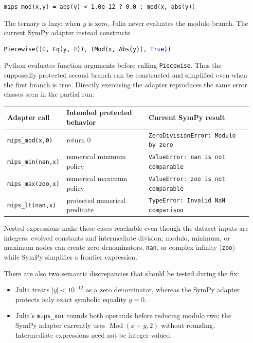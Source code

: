 \documentclass[10pt]{article}
\begin{document}
\begin{lstlisting}
mips_mod(x,y) = abs(y) < 1.0e-12 ? 0.0 : mod(x, abs(y))
\end{lstlisting}

The ternary is lazy: when $y$ is zero, Julia never evaluates the modulo branch.
The current SymPy adapter instead constructs

\begin{lstlisting}[language=Python]
Piecewise((0, Eq(y, 0)), (Mod(x, Abs(y)), True))
\end{lstlisting}

Python evaluates function arguments before calling \texttt{Piecewise}.  Thus
the supposedly protected second branch can be constructed and simplified even
when the first branch is true.  Directly exercising the adapter reproduces the
same error classes seen in the partial run:

\begin{center}
\begin{tabularx}{0.92\linewidth}{lYl}
\toprule
Adapter call & Intended protected behavior & Current SymPy result\\
\midrule
\texttt{mips\_mod(x,0)} & return 0 & \texttt{ZeroDivisionError: Modulo by zero}\\
\texttt{mips\_min(nan,x)} & numerical minimum policy & \texttt{ValueError: nan is not comparable}\\
\texttt{mips\_max(zoo,x)} & numerical maximum policy & \texttt{ValueError: zoo is not comparable}\\
\texttt{mips\_lt(nan,x)} & protected numerical predicate & \texttt{TypeError: Invalid NaN comparison}\\
\bottomrule
\end{tabularx}
\end{center}

Nested expressions make these cases reachable even though the dataset inputs
are integers: evolved constants and intermediate division, modulo, minimum, or
maximum nodes can create zero denominators, \texttt{nan}, or complex infinity
(\texttt{zoo}) while SymPy simplifies a frontier expression.

There are also two semantic discrepancies that should be tested during the fix:

\begin{itemize}
  \item Julia treats $|y|<10^{-12}$ as a zero denominator, whereas the SymPy
        adapter protects only exact symbolic equality $y=0$.
  \item Julia's \texttt{mips\_xor} rounds both operands before reducing modulo
        two; the SymPy adapter currently uses $\operatorname{Mod}(x+y,2)$ without
        rounding.  Intermediate expressions need not be integer-valued.
\end{itemize}
\end{document}
